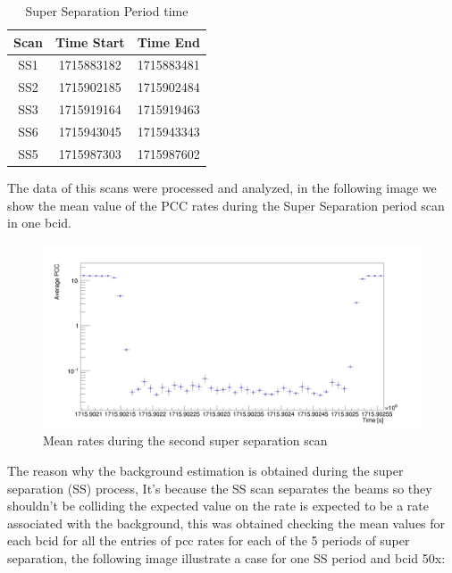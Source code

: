 \begin{table} [H]
\begin{center}
\caption{Super Separation Period time}
\begin{tabular}{|c c c|} 
 \hline
 Scan & Time Start & Time End  \\ [0.5ex] 
 \hline\hline
 SS1 & 1715883182 & 1715883481  \\ 
 \hline
 SS2 & 1715902185 & 1715902484  \\
 \hline
 SS3 & 1715919164 & 1715919463 \\
 \hline
 SS6 & 1715943045 & 1715943343  \\
 \hline
 SS5 & 1715987303 & 1715987602  \\ [1.0ex]
 \hline
\end{tabular}
\end{center}
\end{table}

The data of this scans were processed and analyzed, in the following image we show the mean value of the PCC rates during the Super Separation period scan in one bcid.

\begin{figure}[H]
    \centering
    \includegraphics[width=1\textwidth]{SS1.jpeg}
    \caption{Mean rates during the second super separation scan}
    \label{fig:SS1}
\end{figure}

The reason why the background estimation is obtained during the super separation (SS) process, It's because the SS scan separates the beams so they shouldn't be colliding the expected value on the rate is expected to be a rate associated with the background, this was obtained checking the mean values for each bcid for all the entries of pcc rates for each of the 5 periods of super separation, the following image illustrate a case for one SS period and bcid 50x:

